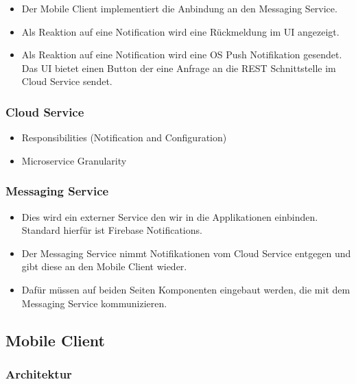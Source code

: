         \begin{itemize}
            \item Der Mobile Client implementiert die Anbindung an den Messaging Service. 
            \item Als Reaktion auf eine Notification wird eine Rückmeldung im UI angezeigt. 
            \item Als Reaktion auf eine Notification wird eine OS Push Notifikation gesendet. 
            Das UI bietet einen Button der eine Anfrage an die REST Schnittstelle im Cloud Service sendet. 
        \end{itemize}


    \subsubsection*{Cloud Service}

        \begin{itemize}
            \item Responsibilities (Notification and Configuration)
            \item Microservice Granularity
        \end{itemize}


    \subsubsection*{Messaging Service}

        \begin{itemize}
            \item Dies wird ein externer Service den wir in die Applikationen einbinden. Standard hierfür ist Firebase Notifications. 
            \item Der Messaging Service nimmt Notifikationen vom Cloud Service entgegen und gibt diese an den Mobile Client wieder. 
            \item Dafür müssen auf beiden Seiten Komponenten eingebaut werden, die mit dem Messaging Service kommunizieren.
        \end{itemize}

\clearpage
\subsection{Mobile Client}\label{subsec:mobile-client}

\subsubsection{Architektur}
